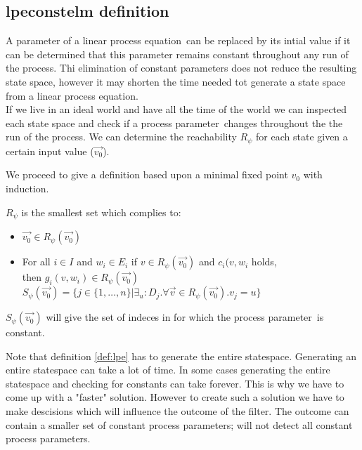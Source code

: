 \documentclass[a4paper,10pt]{article}
\newcommand{\lpe}{linear process equation}
\newcommand{\ovr}{\overrightarrow}
\newcommand{\pp}{process parameter}
\newcommand{\pps}{process parameters}
\begin{document}
\subsection{lpeconstelm definition}\label{subsec:lpedef}

A parameter of a \lpe\ can be replaced by its intial value if it can be determined that this parameter remains constant throughout any run of the process. Thi elimination of constant parameters does not reduce the resulting state space, however it may shorten the time needed tot generate a state space from a \lpe. \\
If we live in an ideal world and have all the time of the world we can inspected each state space and check if a \pp\ changes throughout the the run of the process. We can determine the reachability $R_{\psi}$ for each state given a certain input value ($\ovr{v_0}$). 

We proceed to give a definition based upon a minimal fixed point $v_0$ with induction. 
\begin{defn}\label{def:lpe}
$R_\psi$ is the smallest set which complies to:
\begin{itemize}
\item $\ovr{v_0} \in R_\psi(\ovr{v_0})$
\item For all $i \in I$ and $w_i \in E_i$ if $v \in R_\psi(\ovr{v_0})$ and $c_i(v, w_i$ holds, \\ then $g_i(v, w_i) \in R_\psi(\ovr{v_0})$ \\

$S_\psi(\ovr{v_0}) = \lbrace j \in  \lbrace 1, \ldots, n \rbrace \vert \exists_u : D_j . \forall \ovr{v} \in R_\psi(\ovr{v_0}) . v_j = u \rbrace $
\end{itemize}

$S_\psi(\ovr{v_0})$ will give the set of indeces in for which the \pp\ is constant.
\end{defn}

Note that definition \ref{def:lpe} has to generate the entire statespace. Generating an entire statespace can take a lot of time. In some cases generating the entire statespace and checking for constants can take forever. This is why we have to come up with a "faster" solution. However to create such a solution we have to make descisions which will influence the outcome of the filter. The outcome can contain a smaller set of constant \pps; will not detect all constant \pps .
\end{document}
